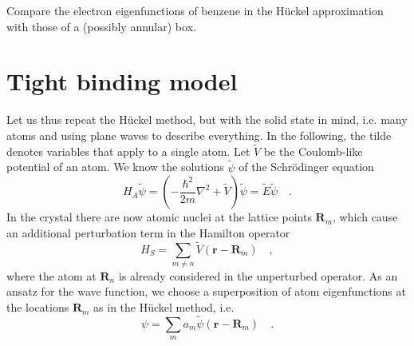 
\begin{questions} 
\item Compare the electron eigenfunctions of benzene in the Hückel approximation with those of a (possibly annular) box.
\end{questions}

\section*{Tight binding model}

Let us thus repeat the Hückel method, but with the solid state in mind, i.e. many atoms and using plane waves to describe everything. In the following, the tilde denotes variables that apply to a single atom. Let $\tilde{V}$ be the Coulomb-like potential of an atom. We know the solutions $\tilde{\psi}$ of the Schrödinger equation
\begin{equation}
    H_A \tilde{\psi} = \left( - \frac{\hbar^2}{2m} \nabla^2 + \tilde{V} \right) \tilde{\psi} = \tilde{E} \tilde{\psi} \quad .
\end{equation}
In the crystal there are now atomic nuclei at the lattice points $\mathbf{R}_m$, which cause an additional perturbation term in the Hamilton operator
\begin{equation}
    H_S = \sum_{m \neq n} \tilde{V}(\mathbf{r} - \mathbf{R}_m) \quad ,
\end{equation}
where the atom at $\mathbf{R}_n$ is already considered in the unperturbed operator. As an ansatz for the wave function, we choose a superposition of atom eigenfunctions at the locations $\mathbf{R}_m$ as in the Hückel method, i.e.
\begin{equation}
    \psi = \sum_m a_m \tilde{\psi} (\mathbf{r} - \mathbf{R}_m) \quad .
\end{equation}

